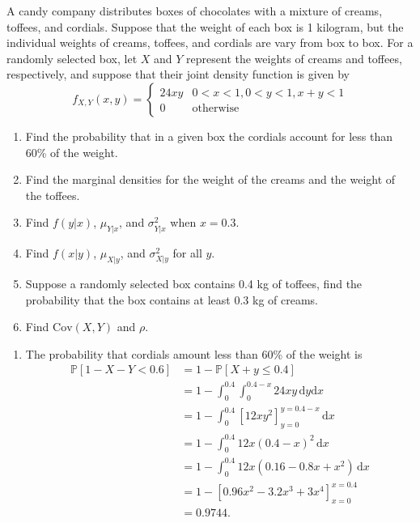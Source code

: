 \begin{mdframed}
    \vspace{-0.25cm}
    \hspace{-0.25cm}
    \begin{Exercise}
        A candy company distributes boxes of chocolates with a mixture of creams, toffees, and cordials.
        Suppose that the weight of each box is 1 kilogram, but the individual weights of creams, toffees, and cordials are 
        vary from box to box. For a randomly selected box, let $X$ and $Y$ represent the 
        weights of creams and toffees, respectively, and suppose that their joint density function 
        is given by
        \[
            f_{X,Y}(x,y) = \begin{cases}
                24xy & 0 < x < 1, 0 < y < 1, x + y < 1\\
                0 & \text{otherwise}
            \end{cases}
        \]
        \begin{enumerate}
            \item Find the probability that in a given box the cordials account 
            for less than 60\% of the weight.
            \item Find the marginal densities for the weight of the creams and the weight of the toffees.
            \item Find $f(y|x)$, $\mu_{Y|x}$, and $\sigma^2_{Y|x}$ when $x = 0.3$.
            \item Find $f(x|y)$, $\mu_{X|y}$, and $\sigma^2_{X|y}$ for all $y$.
            \item Suppose a randomly selected box contains 0.4 kg of toffees, find the probability that 
                the box contains at least 0.3 kg of creams.
            \item Find $\text{Cov}(X, Y)$ and $\rho$.
        \end{enumerate}
    \end{Exercise}
    \begin{Answer}
        \begin{enumerate}
            \item The probability that cordials amount less than 60\% of the weight is
            \begin{align*}
                \mathbb{P}[1 - X - Y  < 0.6] &= 1 - \mathbb{P}[X + y \leq 0.4]\\
                &= 1 - \int^{0.4}_0 \int^{0.4-x}_{0} 24xy \, \mathrm{d}y \mathrm{d}x\\
                &= 1 - \int^{0.4}_0 \left[ 12xy^2 \right]^{y=0.4-x}_{y=0} \, \mathrm{d}x\\
                &= 1 - \int^{0.4}_0 12x(0.4 - x)^2 \, \mathrm{d}x\\
                &= 1 - \int^{0.4}_0 12x \left(0.16 - 0.8x + x^2 \right) \, \mathrm{d}x\\
                &= 1 - \left[ 0.96x^2 - 3.2x^3 + 3x^4 \right]^{x=0.4}_{x=0}\\
                &= 0.9744.
            \end{align*}


\end{enumerate}
\end{Answer}
\end{mdframed}
